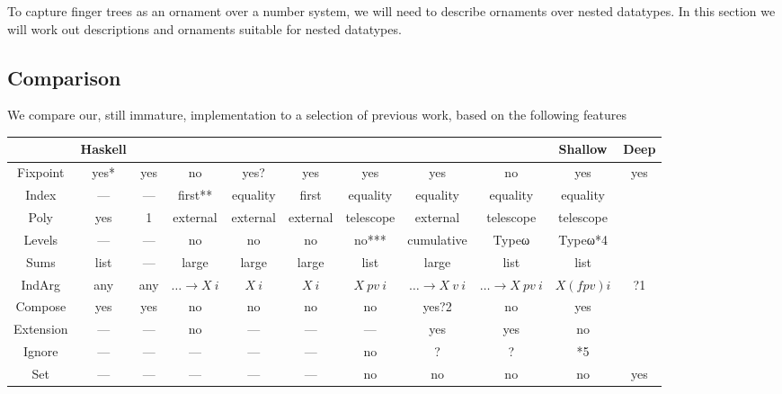 To capture finger trees as an ornament over a number system, we will need to describe ornaments over nested datatypes. In this section we will work out descriptions and ornaments suitable for nested datatypes.

\subsection{Comparison}
We compare our, still immature, implementation to a selection of previous work, based on the following features
\begin{tabular}{c | c c c c c c c c c c}
             & Haskell        & \cite{initenough} & \cite{levitation} & \cite{algorn} & \cite{progorn} & \cite{sijsling} & \cite{effectfully} & \cite{practgen} & Shallow  & Deep    \\
    \hline
    Fixpoint & yes*           & yes               & no                & yes?          & yes            & yes             & yes                & no              & yes       & yes     \\
    Index    & —              & —                 & first**           & equality      & first          & equality        & equality           & equality        & equality  &         \\
    Poly     & yes            & 1                 & external          & external      & external       & telescope       & external           & telescope       & telescope &         \\
    Levels   & —              & —                 & no                & no            & no             & no***           & cumulative         & Typeω           & Typeω*4   &         \\
    Sums     & list           & —                 & large             & large         & large          & list            & large              & list            & list      &         \\
    IndArg   & any            & any               & $\dots \to X\ i$  & $X\ i$        & $X\ i$         & $X\ pv\ i$      & $\dots\to X\ v\ i$ & $\dots\to X\ pv\ i$ & $X (f pv) i$ & ?1 \\
    Compose  & yes            & yes               & no                & no            & no             & no              & yes?2              & no              & yes       &         \\
    Extension& —              & —                 & no                & —             & —              & —               & yes                & yes             & no        &         \\
    Ignore   & —              & —                 & —                 & —             & —              & no              & ?                  & ?               & *5        &         \\
    Set      & —              & —                 & —                 & —             & —              & no              & no                 & no              & no        & yes     \\
\end{tabular}

